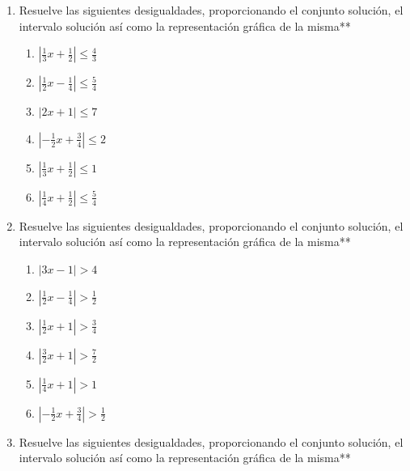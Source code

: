 \documentclass[12pt]{article}
\begin{document}
\begin{enumerate}
  \begin{enumerate}
  \def\labelenumii{\arabic{enumii}.}
  \setcounter{enumii}{2}
  \item
    \(|3x-1|<7\)
  \item
    \(|x-2|<4\)
  \item
    \(|\frac{3}{2}x+1|<5\)
  \item
    \(|2x+1|<6\)
  \item
    \(|\frac{1}{4}x+1|<\frac{7}{2}\)
  \item
    \(|\frac{1}{3}x+\frac{1}{2}|<\frac{5}{6}\)
  \end{enumerate}
\item
  Resuelve las siguientes desigualdades, proporcionando el conjunto
  solución, el intervalo solución así como la representación gráfica de
  la misma**

  \begin{enumerate}
  \def\labelenumii{\arabic{enumii}.}
  \setcounter{enumii}{3}
  \item
    \(|\frac{1}{3}x+\frac{1}{2}|\leq \frac{4}{3}\)
  \item
    \(|\frac{1}{2}x-\frac{1}{4}|\leq \frac{5}{4}\)
  \item
    \(|2x+1|\leq 7\)
  \item
    \(|-\frac{1}{2}x+\frac{3}{4}|\leq 2\)
  \item
    \(|\frac{1}{3}x+\frac{1}{2}|\leq 1\)
  \item
    \(|\frac{1}{4}x+\frac{1}{2}|\leq \frac{5}{4}\)
  \end{enumerate}
\item
  Resuelve las siguientes desigualdades, proporcionando el conjunto
  solución, el intervalo solución así como la representación gráfica de
  la misma**

  \begin{enumerate}
  \def\labelenumii{\arabic{enumii}.}
  \item
    \(|3x-1|>4\)
  \item
    \(|\frac{1}{2}x-\frac{1}{4}|>\frac{1}{2}\)
  \item
    \(|\frac{1}{2}x+1|>\frac{3}{4}\)
  \item
    \(|\frac{3}{2}x+1|>\frac{7}{2}\)
  \item
    \(|\frac{1}{4}x+1|>1\)
  \item
    \(|-\frac{1}{2}x+\frac{3}{4}|>\frac{1}{2}\)
  \end{enumerate}
\item
  Resuelve las siguientes desigualdades, proporcionando el conjunto
  solución, el intervalo solución así como la representación gráfica de
  la misma**


\end{enumerate}
\end{document}
